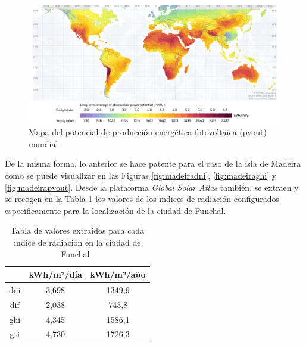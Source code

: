 \vspace{3mm}

\begin{figure}[H]
    \centering
    \includegraphics[width=1\textwidth]{img/diseno/photovoltaic.png}
    \caption{Mapa del potencial de producción energética fotovoltaica (\acrshort{pvout}) mundial \cite{globalsolar}}
    \label{fig:photo}
\end{figure}

\vspace{3mm}

De la misma forma, lo anterior se hace patente para el caso de la isla de Madeira como se puede visualizar en las Figuras \ref{fig:madeiradni}, \ref{fig:madeiraghi} y \ref{fig:madeirapvout}. Desde la plataforma \textit{Global Solar Atlas} también, se extraen y se recogen en la Tabla \ref{tab:global} los valores de los índices de radiación configurados específicamente para la localización de la ciudad de Funchal. 

\vspace{5mm}

\begin{table}[h!]
    \centering
    \begin{tabular}{|c|c|c|}
    \hline
    \rowcolor[HTML]{AAAAAA} 
    \multicolumn{1}{|c|}{\cellcolor[HTML]{AAAAAA}Parámetro} & \multicolumn{1}{c|}{\cellcolor[HTML]{AAAAAA}kWh/m²/día} & kWh/m²/año \\ \hline
    \gls{dni} & 3,698 & 1349,9 \\ \hline
    \gls{dif} & 2,038 & 743,8 \\ \hline
    \gls{ghi} & 4,345 & 1586,1 \\ \hline
    \gls{gti} & 4,730 & 1726,3 \\ \hline
    \end{tabular}
    \caption{Tabla de valores extraídos para cada índice de radiación en la ciudad de Funchal~\cite{globalsolar}}
    \label{tab:global}
\end{table}

